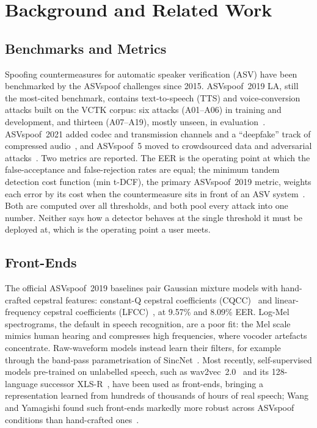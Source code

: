 \documentclass[journal]{IEEEtran}
\begin{document}
\section{Background and Related Work}

\subsection{Benchmarks and Metrics}
Spoofing countermeasures for automatic speaker verification (ASV) have been
benchmarked by the ASVspoof challenges since 2015. ASVspoof~2019 LA, still the
most-cited benchmark, contains text-to-speech (TTS) and voice-conversion
attacks built on the VCTK corpus: six attacks (A01--A06) in training and
development, and thirteen (A07--A19), mostly unseen, in
evaluation~\cite{wang2020asvspoof,todisco2019asvspoof}. ASVspoof~2021 added
codec and transmission channels and a ``deepfake'' track of compressed
audio~\cite{liu2023asvspoof2021}, and ASVspoof~5 moved to crowdsourced data and
adversarial attacks~\cite{wang2024asvspoof5}. Two metrics are reported. The
EER is the operating point at which the false-acceptance and false-rejection
rates are equal; the minimum tandem detection cost function (min t-DCF), the
primary ASVspoof~2019 metric, weights each error by its cost when the
countermeasure sits in front of an ASV system~\cite{kinnunen2018tdcf}.
Both are computed over all thresholds, and both pool every attack into one
number. Neither says how a detector behaves at the single threshold it must
be deployed at, which is the operating point a user meets.

\subsection{Front-Ends}
The official ASVspoof~2019 baselines pair Gaussian mixture models with
hand-crafted cepstral features: constant-Q cepstral coefficients
(CQCC)~\cite{todisco2017cqcc} and linear-frequency cepstral coefficients
(LFCC)~\cite{sahidullah2015lfcc}, at 9.57\% and 8.09\% EER. Log-Mel
spectrograms, the default in speech recognition, are a poor fit: the Mel scale
mimics human hearing and compresses high frequencies, where vocoder artefacts
concentrate. Raw-waveform models instead learn their filters, for example
through the band-pass parametrisation of SincNet~\cite{ravanelli2018sincnet}.
Most recently, self-supervised models pre-trained on unlabelled speech, such
as wav2vec~2.0~\cite{baevski2020wav2vec} and its 128-language successor
XLS-R~\cite{babu2022xlsr}, have been used as front-ends, bringing a
representation learned from hundreds of thousands of hours of real speech;
Wang and Yamagishi found such front-ends markedly more robust across
ASVspoof conditions than hand-crafted ones~\cite{wang2022ssl}.
\end{document}
